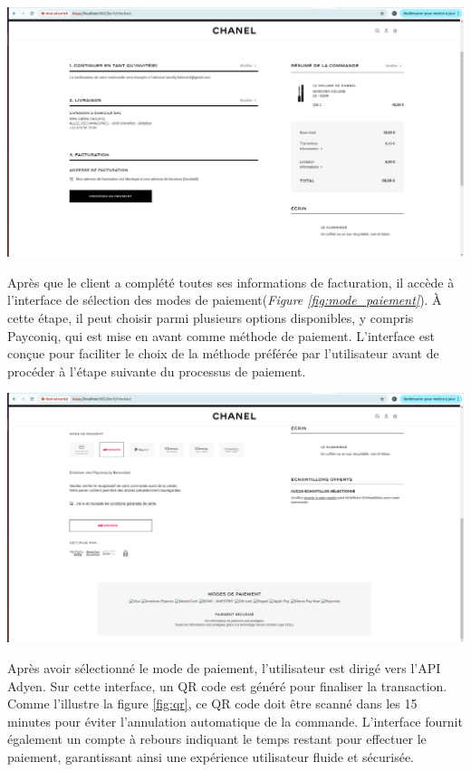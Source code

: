 \begin{center}
    \centering
    \includegraphics[width=19cm]{Figures/Screens/passe au facturation.png}
    \label{fig:facturation}
\end{center}
Après que le client a complété toutes ses informations de facturation, il accède à l'interface de sélection des modes de paiement(\textit{Figure \ref{fig:mode_paiement}}). À cette étape, il peut choisir parmi plusieurs options disponibles, y compris Payconiq, qui est mise en avant comme méthode de paiement. 
L'interface est conçue pour faciliter le choix de la méthode préférée par l'utilisateur avant de procéder à l'étape suivante du processus de paiement.
\begin{center}
    \centering
    \includegraphics[width=19cm]{Figures/Screens/payment.png}
    \label{fig:mode_paiement}
\end{center}
Après avoir sélectionné le mode de paiement, l'utilisateur est dirigé vers l'API Adyen. Sur cette interface, un QR code est généré pour finaliser la transaction. Comme l'illustre la figure \ref{fig:qr}, ce QR code doit être scanné dans les 15 minutes pour éviter l'annulation automatique de la commande. L'interface fournit également un compte à rebours indiquant le temps restant pour effectuer le paiement, garantissant ainsi une expérience utilisateur fluide et sécurisée.
